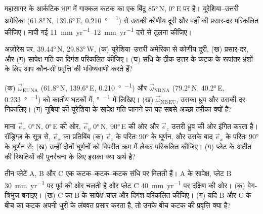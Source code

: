 \begin{exercise}[$\star\star$]\label{exo:b1:plate-kinematics:5}
महासागर के आर्कटिक भाग में गाक्कल कटक का एक बिंदु \ang{85}\,N, \ang{0}\,E पर है। यूरेशिया–उत्तरी अमेरिका  (\ang{61.8}\,N, \ang{139.6}\,E, \qty{0.210}{\degree\per\Myr}) से उसकी कोणीय दूरी और वहाँ की प्रसार-दर परिकलित कीजिए। मापी गई \qtyrange{11}{12}{mm.yr^{-1}} दरों से तुलना कीजिए।
\end{exercise}

\begin{exercise}[$\star\star$]\label{exo:b1:plate-kinematics:6}
अज़ोरेस  पर, \ang{39.44}\,N, \ang{29.83}\,W, (क) यूरेशिया–उत्तरी अमेरिका  से कोणीय दूरी, (ख) प्रसार-दर, और (ग) सापेक्ष गति का दिगंश परिकलित कीजिए। (घ) संधि के ठीक उत्तर के कटक के रूपांतर भ्रंशों के लिए आप कौन-सी प्रवृत्ति की भविष्यवाणी करते हैं?
\end{exercise}

\begin{exercise}[$\star\star$]\label{exo:b1:plate-kinematics:7}
(क)  $\vec\omega_{\mathrm{EU\,NA}}$ (\ang{61.8}\,N, \ang{139.6}\,E, \qty{0.210}{\degree\per\Myr}) और $\vec\omega_{\mathrm{NB\,NA}}$
(\ang{79.2}\,N, \ang{40.2}\,E, \qty{0.233}{\degree\per\Myr}) को कार्तीय घटकों में, \unit{\degree\per\Myr} में लिखिए। (ख) $\vec\omega_{\mathrm{NB\,EU}}$, उसका ध्रुव और उसकी दर निकालिए। (ग) नूबिया की यूरेशिया के सापेक्ष गति जानने का यह सबसे अच्छा तरीका क्यों है?
\end{exercise}

\begin{exercise}[$\star\star$]\label{exo:b1:plate-kinematics:8}
माना $\vec e_x$ \ang{0}\,N, \ang{0}\,E की ओर, $\vec e_y$ \ang{0}\,N, \ang{90}\,E की ओर और $\vec e_z$ उत्तरी ध्रुव की ओर इंगित करता है। रॉड्रिग्ज़ के सूत्र से, $\vec e_x$ का प्रतिबिंब (क) $\vec e_z$ के परितः \ang{90} के घूर्णन, और उसके बाद $\vec e_x$ के परितः \ang{90} के घूर्णन से; (ख) उन्हीं दोनों घूर्णनों को विपरीत क्रम में लेकर परिकलित कीजिए। (ग) प्लेट के अतीत की स्थितियों की पुनर्रचना के लिए इसका क्या अर्थ है?
\end{exercise}

\begin{exercise}[$\star\star$]\label{exo:b1:plate-kinematics:9}
तीन प्लेटें A, B और C एक कटक–कटक–कटक संधि पर मिलती हैं। A के सापेक्ष, प्लेट B \qty{30}{mm.yr^{-1}} पर पूर्व की ओर चलती है और प्लेट C \qty{40}{mm.yr^{-1}} पर दक्षिण की ओर। (क) वेग-त्रिभुज बनाइए। (ख) C का B के सापेक्ष चाल और दिगंश परिकलित कीजिए। (ग) यदि B और C के बीच का कटक अपनी धुरी के लंबवत प्रसार करता है, तो उनके बीच कटक की प्रवृत्ति क्या है?
\end{exercise}

